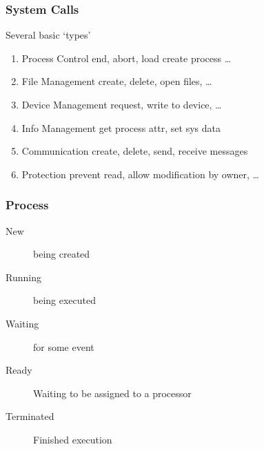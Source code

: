 \documentclass[a4paper]{article}
\newcommand{\resetsize}{\small}
\begin{document}
\begin{multicols*}{2}
    \subsubsection*{System Calls}
    Several basic `types'
    \begin{enumerate}
        \item Process Control \tiny{end, abort, load create process \dots} \resetsize
        \item File Management \tiny{create, delete, open files, \dots} \resetsize
        \item Device Management \tiny{request, write to device, \dots} \resetsize
        \item Info Management \tiny{get process attr, set sys data} \resetsize
        \item Communication \tiny{create, delete, send, receive messages} \resetsize
        \item Protection \tiny{prevent read, allow modification by owner, \dots} \resetsize
    \end{enumerate}

    \subsubsection*{Process}


    \begin{description}
        \item[New] being created
        \item[Running] being executed
        \item[Waiting] for some event
        \item[Ready] Waiting to be assigned to a processor
        \item[Terminated] Finished execution
    \end{description}



\end{multicols*}
\end{document}
